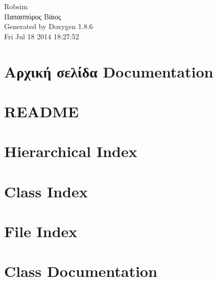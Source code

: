 \documentclass[twoside]{book}
\newcommand{\clearemptydoublepage}{%
  \newpage{\pagestyle{empty}\cleardoublepage}%
}
\begin{document}
\hypersetup{pageanchor=false}
\begin{titlepage}
\vspace*{7cm}
\begin{center}%
{\Large Robsim \\[1ex]\large Παπασπύρος Βάιος }\\
\vspace*{1cm}
{\large Generated by Doxygen 1.8.6}\\
\vspace*{0.5cm}
{\small Fri Jul 18 2014 18:27:52}\\
\end{center}
\end{titlepage}
\clearemptydoublepage
\tableofcontents
\clearemptydoublepage
{}
\hypersetup{pageanchor=true}

\chapter{Αρχική σελίδα Documentation}
\label{index}\hypertarget{index}{}
\chapter{R\-E\-A\-D\-M\-E}
\label{md__home_baios__desktop_robsim__rob_sim__r_e_a_d_m_e}
\hypertarget{md__home_baios__desktop_robsim__rob_sim__r_e_a_d_m_e}{}

\chapter{Hierarchical Index}

\chapter{Class Index}

\chapter{File Index}

\chapter{Class Documentation}





















\end{document}
